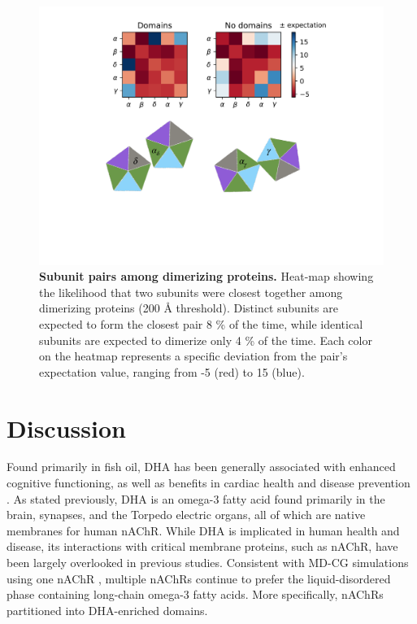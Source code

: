 \begin{figure}[h]
	\center
	\includegraphics[width=1.0\linewidth, trim={3cm 8cm 3cm 8cm}]{Figure4}
\caption[Subunit pairs among dimerizing proteins]{{\bf Subunit pairs among dimerizing proteins.} Heat-map showing the likelihood that two subunits were closest together among dimerizing proteins (200 {\AA} threshold). Distinct subunits are expected to form the closest pair 8 \% of the time, while identical subunits are expected to dimerize only 4 \% of the time. Each color on the heatmap represents a specific deviation from the pair's expectation value, ranging from -5 (red) to 15 (blue).  }
\label{fig:Figure7}
\end{figure}



\section{Discussion}


Found primarily in fish oil, DHA has been generally associated with enhanced cognitive functioning, as well as benefits in cardiac health and disease prevention \cite{12439486320170901}. 
As stated previously, DHA is an omega-3 fatty acid  found primarily in the brain, synapses, and the Torpedo electric organs, all of which are native membranes for human nAChR. While DHA is implicated in human health and disease, its interactions with critical membrane proteins, such as nAChR, have been largely overlooked in previous studies. Consistent with MD-CG simulations using one nAChR \cite{Sharp2018}, multiple nAChRs continue to prefer the liquid-disordered phase containing long-chain omega-3 fatty acids. More specifically, nAChRs partitioned into DHA-enriched domains. 

